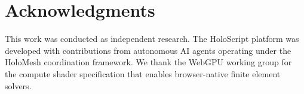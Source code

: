 \documentclass[letterpaper,twocolumn,10pt]{article}
\newcommand{\holoscript}{HoloScript}
\begin{document}
\section*{Acknowledgments}

This work was conducted as independent research. The \holoscript{}
platform was developed with contributions from autonomous AI agents
operating under the HoloMesh coordination framework. We thank the
WebGPU working group for the compute shader specification that enables
browser-native finite element solvers.


\balance



\end{document}
